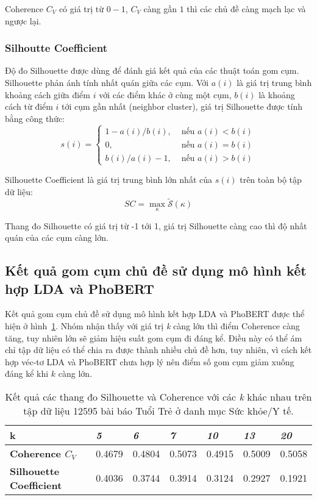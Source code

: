 Coherence $C_V$ có giá trị từ $0-1$, $C_V$ càng gần $1$ thì các chủ đề càng mạch lạc và ngược lại.

\subsubsection{Silhoutte Coefficient}
Độ đo Silhouette được dùng để đánh giá kết quả của các thuật toán gom cụm. Silhouette phản ánh tính nhất quán giữa các cụm. Với $a(i)$ là giá trị trung bình khoảng cách giữa điểm $i$ với các điểm khác ở cùng một cụm, $b(i)$ là khoảng cách từ điểm $i$ tới cụm gần nhất (neighbor cluster), giá trị Silhouette được tính bằng công thức:
$$
s(i)= \begin{cases}1-a(i) / b(i), & \text { nếu } a(i)<b(i) \\ 0, & \text { nếu } a(i)=b(i) \\ b(i) / a(i)-1, & \text { nếu } a(i)>b(i)\end{cases}
$$

Silhouette Coefficient là giá trị trung bình lớn nhất của $s(i)$ trên toàn bộ tập dữ liệu:
$$
S C=\max _{\kappa} \tilde{\mathcal{S}}(\kappa)
$$

Thang đo Silhouette có giá trị từ -1 tới 1, giá trị Silhouette càng cao thì độ nhất quán của các cụm càng lớn.

\subsection{Kết quả gom cụm chủ đề sử dụng mô hình kết hợp LDA và PhoBERT}
Kết quả gom cụm chủ đề sử dụng mô hình kết hợp LDA và PhoBERT được thể hiện ở hình~\ref{table:lda-phobert-result}. Nhóm nhận thấy với giá trị \textit{k} càng lớn thì điểm Coherence càng tăng, tuy nhiên  lớn sẽ giảm hiệu suất gom cụm đi đáng kể. Điều này có thể ám chỉ tập dữ liệu có thể chia ra được thành nhiều chủ đề hơn, tuy nhiên, vì cách kết hợp véc-tơ LDA và PhoBERT chưa hợp lý nên điểm số gom cụm giảm xuống đáng kể khi $k$ càng lớn.

\begin{table}[ht!]
    \centering
    \begin{tabular}{lllllll}
        \hline
        \textbf{k}          & \textit{5} & \textit{6} & \textit{7} & \textit{10} & \textit{13} & \textit{20} \\ \hline
        \textbf{Coherence $C_V$}  & 0.4679     & 0.4804     & 0.5073     & 0.4915      & 0.5009      & 0.5058      \\
        \textbf{Silhouette Coefficient} & 0.4036     & 0.3744     & 0.3914     & 0.3124      & 0.2927      & 0.1921     
    \end{tabular}
    \caption{Kết quả các thang đo Silhouette và Coherence với các \textit{k}
    khác nhau trên tập dữ liệu 12595 bài báo Tuổi Trẻ ở danh mục Sức khỏe/Y tế.}
    \label{table:lda-phobert-result}
\end{table}

